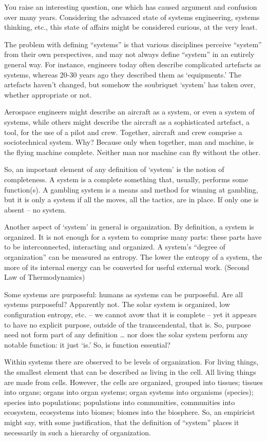 You raise an interesting question, one which has caused argument and confusion over many years. Considering the advanced state of systems engineering, systems thinking, etc., this state of affairs might be considered curious, at the very least.

The problem with defining “systems” is that various disciplines perceive “system” from their own perspectives, and may not always define “system” in an entirely general way. For instance, engineers today often describe complicated artefacts as systems, whereas 20-30 years ago they described them as ‘equipments.’  The artefacts haven’t changed, but somehow the soubriquet ‘system’ has taken over, whether appropriate or not.

Aerospace engineers might describe an aircraft as a system, or even a system of systems, while others might describe the aircraft as a sophisticated artefact, a tool, for the use of a pilot and crew. Together, aircraft and crew comprise a sociotechnical system. Why?  Because only when together, man and machine, is the flying machine complete. Neither man nor machine can fly without the other.

So, an important element of any definition of ‘system’ is the notion of completeness. A system is a complete something that, usually, performs some function(s). A gambling system is a means and method for winning at gambling, but it is only a system if all the moves, all the tactics, are in place. If only one is absent – no system.

Another aspect of ‘system’ in general is organization. By definition, a system is organized. It is not enough for a system to comprise many parts: these parts have to be interconnected, interacting and organized. A system’s “degree of organization” can be measured as entropy. The lower the entropy of a system, the more of its internal energy can be converted for useful external work. (Second Law of Thermodynamics)

Some systems are purposeful: humans as systems can be purposeful. Are all systems purposeful? Apparently not. The solar system is organized, low configuration entropy, etc. – we cannot avow that it is complete – yet it appears to have no explicit purpose, outside of the transcendental, that is. So, purpose need not form part of any definition … nor does the solar system perform any notable function: it just `is.’ So, is function essential?

Within systems there are observed to be levels of organization. For living things, the smallest element that can be described as living in the cell. All living things are made from cells. However, the cells are organized, grouped into tissues; tissues into organs; organs into organ systems; organ systems into organisms (species); species into populations; populations into communities, communities into ecosystem, ecosystems into biomes; biomes into the biosphere. So, an empiricist might say, with some justification, that the definition of “system” places it necessarily in such a hierarchy of organization.


